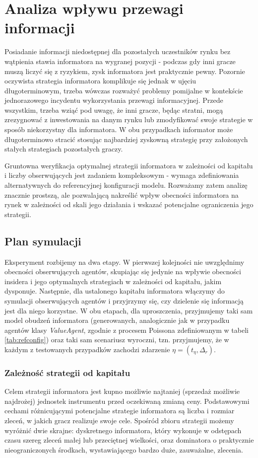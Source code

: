 \chapter{Analiza wpływu przewagi informacji}
Posiadanie informacji niedostępnej dla pozostałych uczestników rynku bez wątpienia stawia informatora na wygranej pozycji - podczas gdy inni gracze muszą liczyć się z ryzykiem, zysk informatora jest praktycznie pewny. Pozornie oczywista strategia informatora komplikuje się jednak w ujęciu długoterminowym, trzeba wówczas rozważyć problemy pomijalne w kontekście jednorazowego incydentu wykorzystania przewagi informacyjnej. Przede wszystkim, trzeba wziąć pod uwagę, że inni gracze, będąc stratni, mogą zrezygnować z inwestowania na danym rynku lub zmodyfikować swoje strategie w sposób niekorzystny dla informatora. W obu przypadkach informator może długoterminowo stracić stosując najbardziej zyskowną strategię przy założonych stałych strategiach pozostałych graczy. 

Gruntowna weryfikacja optymalnej strategii informatora w zależności od kapitału i liczby obserwujących jest zadaniem kompleksowym - wymaga zdefiniowania alternatywnych do referencyjnej konfiguracji modelu. Rozważamy zatem analizę znacznie prostszą, ale pozwalającą nakreślić wpływ obecności informatora na rynek w zależności od skali jego działania i wskazać potencjalne ograniczenia jego strategii.

\section{Plan symulacji}

Eksperyment rozbijemy na dwa etapy. W pierwszej kolejności nie uwzględnimy obecności obserwujących agentów, skupiając się jedynie na wpływie obecności insidera i jego optymalnych strategiach w zależności od kapitału, jakim dysponuje. Następnie, dla ustalonego kapitału informatora włączymy do symulacji obserwujących agentów i przyjrzymy się, czy dzielenie się informacją jest dla niego korzystne. W obu etapach, dla uproszczenia, przyjmujemy taki sam model obudzeń informatora (generowanych, analogicznie jak w przypadku agentów klasy \textit{ValueAgent}, zgodnie z procesem Poissona zdefiniowanym w tabeli \ref{tab:refconfig}) oraz taki sam scenariusz wyroczni, tzn. przyjmujemy, że w każdym z testowanych przypadków zachodzi zdarzenie $\eta = (t_{\eta}, \Delta_r).$

\subsection{Zależność strategii od kapitału}
Celem strategii informatora jest kupno możliwie najtaniej (sprzedaż możliwie najdrożej) jednostek instrumentu przed oczekiwaną zmianą ceny. Podstawowymi cechami różnicującymi potencjalne strategie informatora są liczba i rozmiar zleceń, w jakich gracz realizuje swoje cele. Spośród zbioru strategii możemy wyróżnić dwie skrajne: dyskretnego informatora, który wykonuje w odstępach czasu szereg zleceń małej lub przeciętnej wielkości, oraz dominatora o praktycznie nieograniczonych środkach, wystawiającego bardzo duże, zauważalne, zlecenia.

